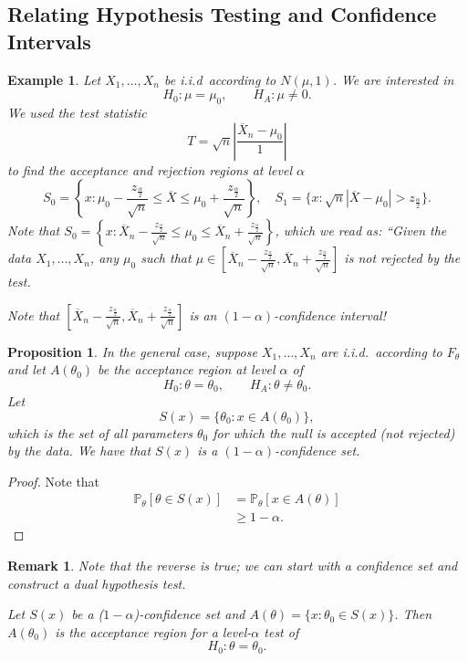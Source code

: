 \documentclass{tufte-handout}
\renewcommand{\P}{\mathbb{P}}
\newtheorem{rmk}[thm]{Remark}
\newtheorem{ex}[thm]{Example}
\newtheorem{prop}[thm]{Proposition}
\theoremstyle{definition}
\begin{document}
\subsection{Relating Hypothesis Testing and Confidence Intervals}
\begin{ex}
	Let $X_1,\ldots,X_n$ be i.i.d\ according to $N(\mu,1)$. We are interested in \[
		H_0: \mu = \mu_0, \qquad H_A: \mu \ne 0
	.\] We used the test statistic \[
		T = \sqrt{n}  \left| \frac{\overline{X}_n - \mu_0}{1} \right|
	\] to find the acceptance and rejection regions at level $\alpha$ \[
		S_0 = \left\{x: \mu_0 - \frac{z_{\frac{\alpha}{2}}}{\sqrt{n} } \le \overline{X} \le \mu_0 + \frac{z_{\frac{\alpha}{2}}}{\sqrt{n} }\right\}, \quad S_1 = \{x: \sqrt{n} \left| \overline{X} - \mu_0 \right| > z_{\frac{\alpha}{2}}\}
	.\] Note that $S_0 = \left\{x: \overline{X}_n - \frac{z_{\frac{\alpha}{2}}}{\sqrt{n} } \le \mu_0 \le \overline{X}_n + \frac{z_{\frac{\alpha}{2}}}{\sqrt{n} }\right\}$, which we read as: ``Given the data $X_1,\ldots,X_n$, any $\mu_0$ such that $\mu \in \left[ \overline{X}_n - \frac{z_{\frac{\alpha}{2}}}{\sqrt{n} }, \overline{X}_n + \frac{z_{\frac{\alpha}{2}}}{\sqrt{n} } \right]$ is not rejected by the test.

	Note that $\left[  \overline{X}_n - \frac{z_{\frac{\alpha}{2}}}{\sqrt{n} }, \overline{X}_n + \frac{z_{\frac{\alpha}{2}}}{\sqrt{n} } \right]$ is an $(1-\alpha)$-confidence interval! 
\end{ex}

\begin{prop}
	In the general case, suppose $X_1,\ldots,X_n$ are i.i.d.\ according to $F_\theta$ and let $A(\theta_0)$ be the acceptance region at level $\alpha$ of \[
		H_0 : \theta = \theta_0, \qquad H_A: \theta \ne \theta_0
	.\] Let \[
		S(x) = \{\theta_0 : x \in A(\theta_0)\}
	,\] which is the set of all parameters $\theta_0$ for which the null is accepted (not rejected) by the data. We have that $S(x)$ is a $(1-\alpha)$-confidence set.
\end{prop}
\begin{proof}
	Note that 
	\begin{align*}
		\P_\theta\left[\theta \in S(x)\right] &= \P_\theta\left[x \in A(\theta)\right] \\
											  &\ge 1-\alpha
	.\end{align*}
\end{proof}
\begin{rmk}
	Note that the reverse is true; we can start with a confidence set and construct a dual hypothesis test.

	Let $S(x)$ be a ($1-\alpha$)-confidence set and $A(\theta) = \{x: \theta_0 \in S(x)\}$. Then $A(\theta_0)$ is the acceptance region for a level-$\alpha$ test of \[
		H_0: \theta = \theta_0
	.\] 
\end{rmk}
\end{document}
